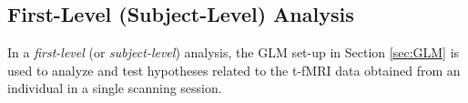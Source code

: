 %

\subsection{First-Level (Subject-Level) Analysis}
\label{sec:first_level}

In a \textit{first-level} (or \textit{subject-level}) analysis, the GLM set-up in Section \ref{sec:GLM} is used to analyze and test hypotheses related to the t-fMRI data obtained from an individual in a single scanning session. 

